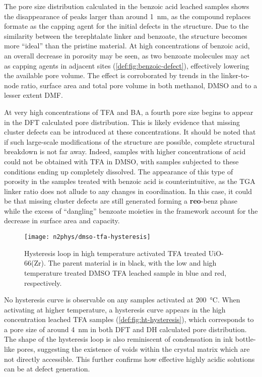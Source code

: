 The pore size distribution calculated in the benzoic acid leached
samples shows the disappearance of peaks larger than around 
\SI{1}{\nano\metre}, as the compound replaces formate as the 
capping agent for the initial defects in the structure. Due to the 
similarity between the terephtalate linker and benzoate, the structure
becomes more ``ideal'' than the pristine material. At high concentrations
of benzoic acid, an overall decrease in porosity may be seen, as 
two benzoate molecules may act as capping agents in adjacent 
sites (\autoref{def:fig:benzoic-defect}), effectively 
lowering the available pore volume. The effect is corroborated 
by trends in the linker-to-node ratio, surface area and total 
pore volume in both methanol, \gls{DMSO} and to a lesser extent \gls{DMF}.

At very high concentrations of \gls{TFA} and \gls{BA}, a fourth pore size
begins to appear in the \gls{DFT} calculated pore distribution.
This is likely evidence that missing cluster defects can be 
introduced at these concentrations. It should be noted that 
if such large-scale modifications of the structure are possible,
complete structural breakdown is not far away. Indeed, samples with 
higher concentrations of acid could not be obtained with \gls{TFA} in \gls{DMSO},
with samples subjected to these conditions ending up completely
dissolved. The appearance of this type of porosity in the samples
treated with benzoic acid is counterintuitive, as the \gls{TGA} linker
ratio does not allude to any changes in coordination. In this case,
it could be that missing cluster defects are still generated
forming a \textbf{reo}-benz phase~\cite{atzoriEffectBenzoicAcid2017} 
while the excess of ``dangling'' benzoate moieties in the framework 
account for the decrease in surface area and capacity.

\begin{figure}[htb]
	\centering
	\texttt{[image: n2phys/dmso-tfa-hysteresis]}
	\caption{Hysteresis loop in high temperature activated \gls{TFA} treated 
	UiO-66(Zr). The parent material is in black, with the low and high 
	temperature treated DMSO TFA leached sample in blue and red,
	respectively.
	}\label{def:fig:ht-hysteresis}
\end{figure}

No hysteresis curve is observable on any samples activated at 
\SI{200}{\degreeCelsius}. When activating at higher temperature,
a hysteresis curve appears in the high concentration leached
\gls{TFA} samples (\autoref{def:fig:ht-hysteresis}), which corresponds to
a pore size of around \SI{4}{\nano\metre} in both \gls{DFT} and \gls{DH} calculated
pore distribution. The shape of the hysteresis loop is also 
reminiscent of condensation in ink bottle-like pores, suggesting
the existence of voids within the crystal matrix which are 
not directly accessible. This further confirms how effective 
highly acidic solutions can be at defect generation.
